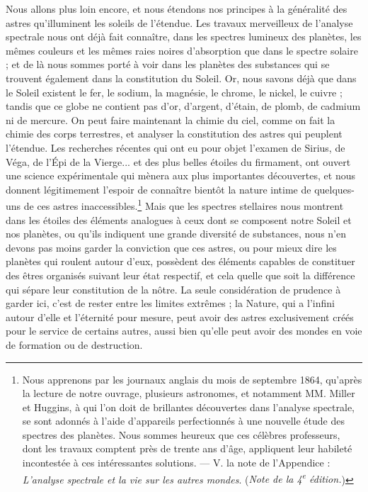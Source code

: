 \documentclass[a4paper, 11pt, oneside, landscape]{article}
\begin{document}
Nous allons plus loin encore, et nous étendons nos principes à la généralité des astres qu'illuminent les soleils de l'étendue. Les travaux merveilleux de l'analyse spectrale nous ont déjà fait connaître, dans les spectres lumineux des planètes, les mêmes couleurs et les mêmes raies noires d'absorption que dans le spectre solaire ; et de là nous sommes porté à voir dans les planètes des substances qui se trouvent également dans la constitution du Soleil. Or, nous savons déjà que dans le Soleil existent le fer, le sodium, la magnésie, le chrome, le nickel, le cuivre ; tandis que ce globe ne contient pas d'or, d'argent, d'étain, de plomb, de cadmium ni de mercure. On peut faire maintenant la chimie du ciel, comme on fait la chimie des corps terrestres, et analyser la constitution des astres qui peuplent l'étendue. Les recherches récentes qui ont eu pour objet l'examen de Sirius, de Véga, de l'Épi de la Vierge... et des plus belles étoiles du firmament, ont ouvert une science expérimentale qui mènera aux plus importantes découvertes, et nous donnent légitimement l'espoir de connaître bientôt la nature intime de quelques-uns de ces astres inaccessibles.\footnote{Nous apprenons par les journaux anglais du mois de septembre 1864, qu'après la lecture de notre ouvrage, plusieurs astronomes, et notamment MM. Miller et Huggins, à qui l'on doit de brillantes découvertes dans l'analyse spectrale, se sont adonnés à l'aide d'appareils perfectionnés à une nouvelle étude des spectres des planètes. Nous sommes heureux que ces célèbres professeurs, dont les travaux comptent près de trente ans d'âge, appliquent leur habileté incontestée à ces intéressantes solutions. --- V. la note de l'Appendice : \emph{L'analyse spectrale et la vie sur les autres mondes}. (\emph{Note de la 4\textsuperscript{e} édition.})} Mais que les spectres stellaires nous montrent dans les étoiles des éléments analogues à ceux dont se composent notre Soleil et nos planètes, ou qu'ils indiquent une grande diversité de substances, nous n'en devons pas moins garder la conviction que ces astres, ou pour mieux dire les planètes qui roulent autour d'eux, possèdent des éléments capables de constituer des êtres organisés suivant leur état respectif, et cela quelle que soit la différence qui sépare leur constitution de la nôtre. La seule considération de prudence à garder ici, c'est de rester entre les limites extrêmes ; la Nature, qui a l'infini autour d'elle et l'éternité pour mesure, peut avoir des astres exclusivement créés pour le service de certains autres, aussi bien qu'elle peut avoir des mondes en voie de formation ou de destruction.
\end{document}
